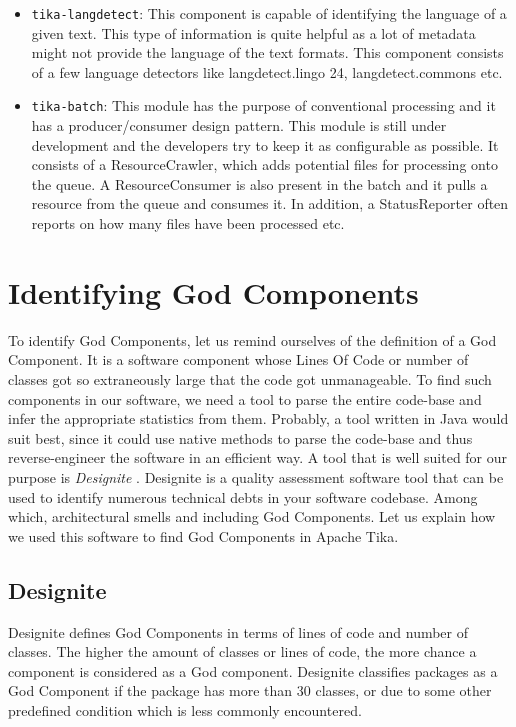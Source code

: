 \documentclass{article}
\begin{document}
\begin{itemize}
    \item\texttt{tika-langdetect}: This component is capable of identifying the language of a given text. This type of information is quite helpful as a lot of metadata might not provide the language of the text formats. This component consists of a few language detectors like langdetect.lingo 24, langdetect.commons etc. 
    \item\texttt{tika-batch}: This module has the purpose of conventional processing and it has a producer/consumer design pattern. This module is still under development and the developers try to keep it as configurable as possible. It consists of a ResourceCrawler, which adds potential files for processing onto the queue. A ResourceConsumer is also present in the batch and it pulls a resource from the queue and consumes it. In addition, a StatusReporter often reports on how many files have been processed etc.
    \end{itemize}





\section{Identifying God Components}
To identify God Components, let us remind ourselves of the definition of a God Component. It is a software component whose Lines Of Code or number of classes got so extraneously large that the code got unmanageable. To find such components in our software, we need a tool to parse the entire code-base and infer the appropriate statistics from them. Probably, a tool written in Java would suit best, since it could use native methods to parse the code-base and thus reverse-engineer the software in an efficient way. A tool that is well suited for our purpose is \textit{Designite} \citep{sharma2016designite}. Designite is a quality assessment software tool that can be used to identify numerous technical debts in your software codebase. Among which, architectural smells and including God Components. Let us explain how we used this software to find God Components in Apache Tika.

\subsection{Designite}
Designite defines God Components in terms of lines of code and number of classes. The higher the amount of classes or lines of code, the more chance a component is considered as a God component. Designite classifies packages as a God Component if the package has more than 30 classes, or due to some other predefined condition which is less commonly encountered.
\end{document}
